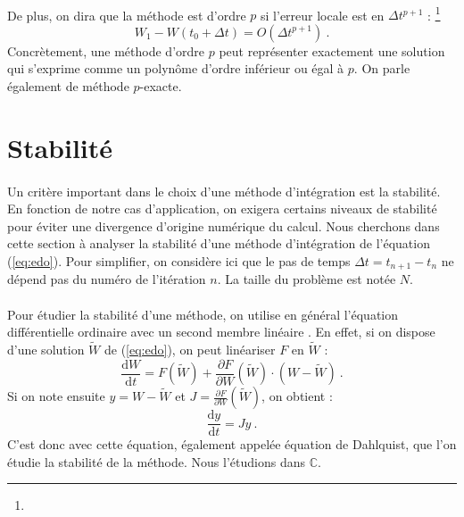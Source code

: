     \paragraph{}
    De plus, on dira que la méthode est d'ordre $p$ si l'erreur locale est en $\Delta t^{p+1}$ \cite{HairerNorsettWanner1993} :
    \footnote{}
    \[W_1 - W\left(t_0 + \Delta t\right) = O\left(\Delta t^{p+1}\right)\ .\]
    Concrètement, une méthode d'ordre $p$ peut représenter exactement une solution qui s'exprime comme un polynôme d'ordre inférieur ou égal à $p$.
    On parle également de méthode $p$-exacte.


  \section{Stabilité}

    \paragraph{}
    Un critère important dans le choix d'une méthode d'intégration est la stabilité.
    En fonction de notre cas d'application, on exigera certains niveaux de stabilité pour éviter une divergence d'origine numérique du calcul.
    Nous cherchons dans cette section à analyser la stabilité d'une méthode d'intégration de l'équation (\ref{eq:edo}).
    Pour simplifier, on considère ici que le pas de temps $\Delta t = t_{n+1} - t_n$ ne dépend pas du numéro de l'itération $n$.
    La taille du problème est notée $N$.

    \paragraph{}
    Pour étudier la stabilité d'une méthode, on utilise en général l'équation différentielle ordinaire avec un second membre linéaire \cite{HairerWanner1996}.
    En effet, si on dispose d'une solution $\tilde{W}$ de (\ref{eq:edo}), on peut linéariser $F$ en $\tilde{W}$ :
    \[\frac{\mathrm{d}W}{\mathrm{d}t} = F\left(\tilde{W}\right) + \frac{\partial F}{\partial W}\left(\tilde{W}\right)\cdot\left(W - \tilde{W}\right)\ .\]
    Si on note ensuite $y = W - \tilde{W}$ et $J = \frac{\partial F}{\partial W}\left(\tilde{W}\right)$, on obtient :
    \begin{equation}\label{eq:stab}
      \frac{\mathrm{d}y}{\mathrm{d}t} = Jy\ .
    \end{equation}
    C'est donc avec cette équation, également appelée équation de Dahlquist, que l'on étudie la stabilité de la méthode.
    Nous l'étudions dans $\mathbb{C}$.


